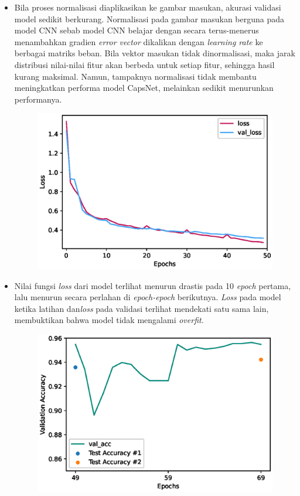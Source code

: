 \documentclass{article}
\begin{document}
\begin{itemize}
		\item Bila proses normalisasi diaplikasikan ke gambar masukan, akurasi validasi model sedikit berkurang. Normalisasi pada gambar masukan berguna pada model CNN sebab model CNN belajar dengan secara terus-menerus menambahkan gradien \textit{error vector} dikalikan dengan \textit{learning rate} ke berbagai matriks beban. Bila vektor masukan tidak dinormalisasi, maka jarak distribusi nilai-nilai fitur akan berbeda untuk setiap fitur, sehingga hasil kurang maksimal. Namun, tampaknya normalisasi tidak membantu meningkatkan performa model CapsNet, melainkan sedikit menurunkan performanya.
		
	    \begin{figure}[H]
			\centering
			\includegraphics[scale=1]{analisis model/final_loss.eps}
		\end{figure}
		
		\item Nilai fungsi \textit{loss} dari model terlihat menurun drastis pada 10 \textit{epoch} pertama, lalu menurun secara perlahan di \textit{epoch-epoch} berikutnya. \textit{Loss} pada model ketika latihan dan\textit{loss} pada validasi terlihat mendekati satu sama lain, membuktikan bahwa model tidak mengalami \textit{overfit}.
		
		\begin{figure}[H]
			\centering
			\includegraphics[scale=1]{analisis model/covid_learn_acc.eps}
		\end{figure}
	

\end{itemize}
\end{document}
